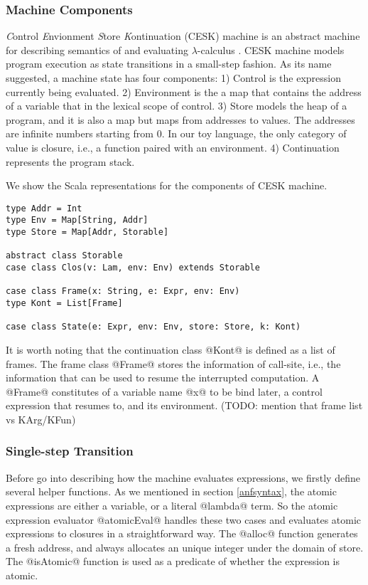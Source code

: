 \documentclass[acmsmall,review,anonymous]{acmart}\settopmatter{printfolios=true,printccs=false,printacmref=false}
\begin{document}
\subsubsection{Machine Components}

\textit{C}ontrol \textit{E}nvionment \textit{S}tore \textit{K}ontinuation (CESK) machine is an
abstract machine for describing semantics of and evaluating $\lambda$-calculus \cite{felleisen1987calculus}.
CESK machine models program execution as state transitions in a small-step fashion. As its name suggested,
a machine state has four components: 1) Control is the expression currently being evaluated.
2) Environment is the a map that contains the address of a variable that in the lexical
scope of control.
3) Store models the heap of a program, and it is also a map but maps from addresses to values.
The addresses are infinite numbers starting from 0.
In our toy language, the only category of value is closure, i.e., a function paired with an environment.
4) Continuation represents the program stack.

We show the Scala representations for the components of CESK machine.

\begin{lstlisting}
type Addr = Int
type Env = Map[String, Addr]
type Store = Map[Addr, Storable]

abstract class Storable
case class Clos(v: Lam, env: Env) extends Storable

case class Frame(x: String, e: Expr, env: Env)
type Kont = List[Frame]

case class State(e: Expr, env: Env, store: Store, k: Kont)
\end{lstlisting}

It is worth noting that the continuation class @Kont@ is defined as a list of frames.
The frame class @Frame@ stores the information of call-site, i.e., the information that
can be used to resume the interrupted computation.
A @Frame@ constitutes of a variable name @x@ to be bind later, a control expression
that resumes to, and its environment. (TODO: mention that frame list vs KArg/KFun)

\subsubsection{Single-step Transition}
Before go into describing how the machine evaluates expressions, we firstly define several helper functions.
As we mentioned in section \ref{anfsyntax}, the atomic expressions are either a variable, or
a literal @lambda@ term. So the atomic expression evaluator @atomicEval@ handles these two
cases and evaluates atomic expressions to closures in a straightforward way.
The @alloc@ function generates a fresh address, and always allocates an unique integer under the domain
of store.
The @isAtomic@ function is used as a predicate of whether the expression is atomic.
\end{document}
